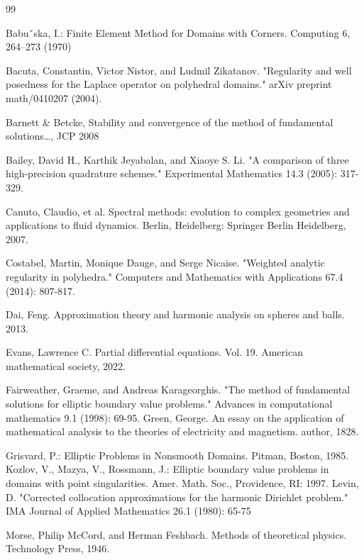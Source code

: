 \documentclass[12pt,oneside,reqno]{amsart}%
\theoremstyle{plain}
\numberwithin{equation}{section}
\begin{document}
\begin{thebibliography}{99}

 Babuˇska, I.: Finite Element Method for Domains with Corners. Computing 6, 264–273
(1970)

 Bacuta, Constantin, Victor Nistor, and Ludmil Zikatanov. "Regularity and well posedness for the Laplace operator on polyhedral domains." arXiv preprint math/0410207 (2004).

Barnett \& Betcke, Stability and convergence of the method of fundamental solutions…, JCP 2008

Bailey, David H., Karthik Jeyabalan, and Xiaoye S. Li. "A comparison of three high-precision quadrature schemes." Experimental Mathematics 14.3 (2005): 317-329.

Canuto, Claudio, et al. Spectral methods: evolution to complex geometries and applications to fluid dynamics. Berlin, Heidelberg: Springer Berlin Heidelberg, 2007.

Costabel, Martin, Monique Dauge, and Serge Nicaise. "Weighted analytic regularity in polyhedra." Computers and Mathematics with Applications 67.4 (2014): 807-817.

Dai, Feng. Approximation theory and harmonic analysis on spheres and balls. 2013.

Evans, Lawrence C. Partial differential equations. Vol. 19. American mathematical society, 2022.

Fairweather, Graeme, and Andreas Karageorghis. "The method of fundamental solutions for elliptic boundary value problems." Advances in computational mathematics 9.1 (1998): 69-95.
Green, George. An essay on the application of mathematical analysis to the theories of electricity and magnetism. author, 1828.

Grisvard, P.: Elliptic Problems in Nonsmooth Domains. Pitman, Boston, 1985.
Kozlov, V., Mazya, V., Rossmann, J.: Elliptic boundary value problems in domains
with point singularities. Amer. Math. Soc., Providence, RI: 1997.
Levin, D. "Corrected collocation approximations for the harmonic Dirichlet problem." IMA Journal of Applied Mathematics 26.1 (1980): 65-75


Morse, Philip McCord, and Herman Feshbach. Methods of theoretical physics. Technology Press, 1946.


\end{thebibliography}
\end{document}

